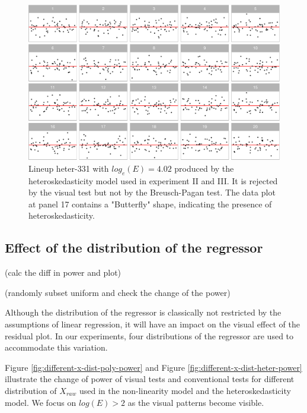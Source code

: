 \documentclass[]{interact}
\theoremstyle{plain}%
\theoremstyle{definition}
\theoremstyle{remark}
\begin{document}
\begin{figure}

{\centering \includegraphics[width=1\linewidth]{paper_comparison_files/figure-latex/heter-example-1} 

}

\caption{Lineup heter-331 with $log_e(E) = 4.02$ produced by the heteroskedasticity model used in experiment II and III. It is rejected by the visual test but not by the  Breusch-Pagan test. The data plot at panel 17 contains a "Butterfly" shape, indicating the presence of heteroskedasticity.}\label{fig:heter-example}
\end{figure}

\hypertarget{effect-of-the-distribution-of-the-regressor}{%
\subsection{Effect of the distribution of the
regressor}\label{effect-of-the-distribution-of-the-regressor}}

(calc the diff in power and plot)

(randomly subset uniform and check the change of the power)

Although the distribution of the regressor is classically not restricted
by the assumptions of linear regression, it will have an impact on the
visual effect of the residual plot. In our experiments, four
distributions of the regressor are used to accommodate this variation.

Figure \ref{fig:different-x-dist-poly-power} and Figure
\ref{fig:different-x-dist-heter-power} illustrate the change of power of
visual tests and conventional tests for different distribution of
\(X_{raw}\) used in the non-linearity model and the heteroskedasticity
model. We focus on \(log(E) > 2\) as the visual patterns become visible.
\end{document}
